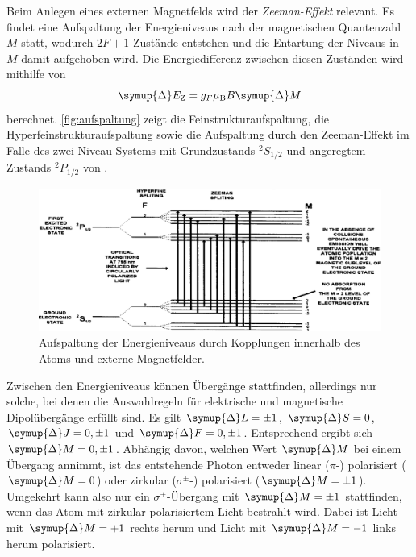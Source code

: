     Beim Anlegen eines externen Magnetfelds wird der \textit{Zeeman-Effekt} relevant.
    Es findet eine Aufspaltung der Energieniveaus nach der magnetischen Quantenzahl $M$ statt,
    wodurch $2F+1$ Zustände entstehen und die Entartung der Niveaus in $M$ damit aufgehoben wird.
    Die Energiedifferenz zwischen diesen Zuständen wird mithilfe von
    \begin{equation}
        \symup{\Delta} E_\text{Z} = g_F \mu_\text{B} B \symup{\Delta} M
        \label{eqn:zeemanaufspaltung}
    \end{equation}
    berechnet.
    \autoref{fig:aufspaltung} zeigt die Feinstrukturaufspaltung,
    die Hyperfeinstrukturaufspaltung sowie die Aufspaltung durch den Zeeman-Effekt im Falle des zwei-Niveau-Systems mit Grundzustands $^2S_{1/2}$ und angeregtem Zustands $^2P_{1/2}$ von .
    \begin{figure}[H]
        \centering
        \includegraphics[width=\textwidth]{content/img/Lit2_Abb_2D-3.png}
        \caption{Aufspaltung der Energieniveaus durch Kopplungen innerhalb des Atoms und externe Magnetfelder. \cite{caltech}}
        \label{fig:aufspaltung}
    \end{figure}
    Zwischen den Energieniveaus können Übergänge stattfinden,
    allerdings nur solche,
    bei denen die Auswahlregeln für elektrische und magnetische Dipolübergänge erfüllt sind.
    Es gilt $\symup{\Delta} L = \pm 1$, $\symup{\Delta} S = 0$, $\symup{\Delta} J = 0, \pm 1$ und $\symup{\Delta} F = 0, \pm 1$.
    Entsprechend ergibt sich $\symup{\Delta} M = 0, \pm 1$.
    Abhängig davon,
    welchen Wert $\symup{\Delta} M$ bei einem Übergang annimmt,
    ist das entstehende Photon entweder linear ($\pi$-) polarisiert ($\symup{\Delta}M = 0$) oder zirkular ($\sigma^{\pm}$-) polarisiert ($\symup{\Delta}M = \pm 1$).
    Umgekehrt kann also nur ein $\sigma^{\pm}$-Übergang mit $\symup{\Delta} M = \pm 1$ stattfinden,
    wenn das Atom mit zirkular polarisiertem Licht bestrahlt wird.
    Dabei ist Licht mit $\symup{\Delta} M = +1$ rechts herum und Licht mit $\symup{\Delta} M =-1$ links herum polarisiert.

